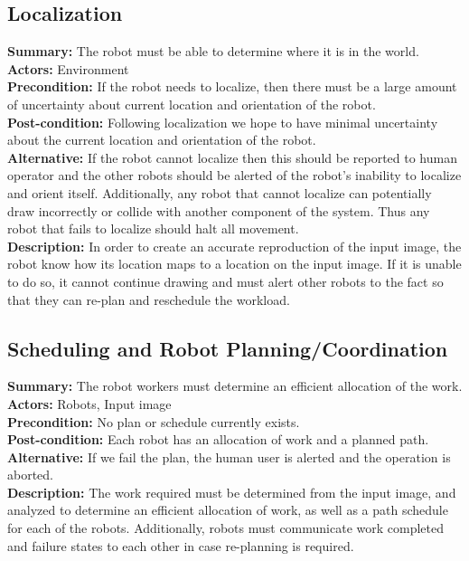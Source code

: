 \subsection{Localization}
\textbf{Summary:} The robot must be able to determine where it is in the world. \\
\textbf{Actors:} Environment \\
\textbf{Precondition:} If the robot needs to localize, then there must be a large amount of uncertainty about current location and orientation of the robot. \\
\textbf{Post-condition:} Following localization we hope to have minimal uncertainty about the current location and orientation of the robot. \\
\textbf{Alternative:} If the robot cannot localize then this should be reported to human operator and the other robots should be alerted of the robot's inability to localize and orient itself. Additionally, any robot that cannot localize can potentially draw incorrectly or collide with another component of the system. Thus any robot that fails to localize should halt all movement. \\
\textbf{Description:} In order to create an accurate reproduction of the input image, the robot know how its location maps to a location on the input image. If it is unable to do so, it cannot continue drawing and must alert other robots to the fact so that they can re-plan and reschedule the workload. \\

\subsection{Scheduling and Robot Planning/Coordination}
\textbf{Summary:} The robot workers must determine an efficient allocation of the work. \\
\textbf{Actors:} Robots, Input image \\
\textbf{Precondition:} No plan or schedule currently exists. \\
\textbf{Post-condition:} Each robot has an allocation of work and a planned path. \\
\textbf{Alternative:} If we fail the plan, the human user is alerted and the operation is aborted. \\
\textbf{Description:} The work required must be determined from the input image, and analyzed to determine an efficient allocation of work, as well as a path schedule for each of the robots. Additionally, robots must communicate work completed and failure states to each other in case re-planning is required. \\

